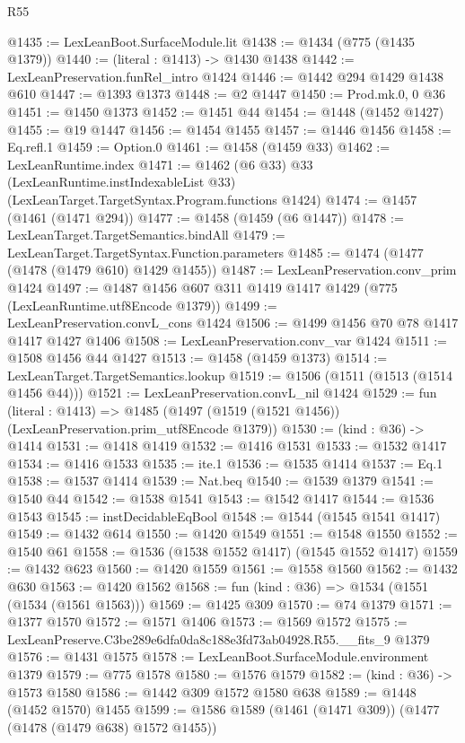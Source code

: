 \begin{lexlean}{R55}
\begin{coremodule}
{{@1435 := LexLeanBoot.SurfaceModule.lit
@1438 := @1434 (@775 (@1435 @1379))
@1440 := (literal : @1413) -> @1430 @1438
@1442 := LexLeanPreservation.funRel_intro @1424
@1446 := @1442 @294 @1429 @1438 @610
@1447 := @1393 @1373
@1448 := @2 @1447
@1450 := Prod.mk.{0, 0} @36
@1451 := @1450 @1373
@1452 := @1451 @44
@1454 := @1448 (@1452 @1427)
@1455 := @19 @1447
@1456 := @1454 @1455
@1457 := @1446 @1456
@1458 := Eq.refl.{1}
@1459 := Option.{0}
@1461 := @1458 (@1459 @33)
@1462 := LexLeanRuntime.index
@1471 := @1462
    (@6 @33)
    @33
    (LexLeanRuntime.instIndexableList @33)
    (LexLeanTarget.TargetSyntax.Program.functions @1424)
@1474 := @1457 (@1461 (@1471 @294))
@1477 := @1458 (@1459 (@6 @1447))
@1478 := LexLeanTarget.TargetSemantics.bindAll
@1479 := LexLeanTarget.TargetSyntax.Function.parameters
@1485 := @1474 (@1477 (@1478 (@1479 @610) @1429 @1455))
@1487 := LexLeanPreservation.conv_prim @1424
@1497 := @1487 @1456 @607 @311 @1419 @1417 @1429 (@775 (LexLeanRuntime.utf8Encode @1379))
@1499 := LexLeanPreservation.convL_cons @1424
@1506 := @1499 @1456 @70 @78 @1417 @1417 @1427 @1406
@1508 := LexLeanPreservation.conv_var @1424
@1511 := @1508 @1456 @44 @1427
@1513 := @1458 (@1459 @1373)
@1514 := LexLeanTarget.TargetSemantics.lookup
@1519 := @1506 (@1511 (@1513 (@1514 @1456 @44)))
@1521 := LexLeanPreservation.convL_nil @1424
@1529 := fun (literal : @1413) =>
  @1485 (@1497 (@1519 (@1521 @1456)) (LexLeanPreservation.prim_utf8Encode @1379))
@1530 := (kind : @36) -> @1414
@1531 := @1418 @1419
@1532 := @1416 @1531
@1533 := @1532 @1417
@1534 := @1416 @1533
@1535 := ite.{1}
@1536 := @1535 @1414
@1537 := Eq.{1}
@1538 := @1537 @1414
@1539 := Nat.beq
@1540 := @1539 @1379
@1541 := @1540 @44
@1542 := @1538 @1541
@1543 := @1542 @1417
@1544 := @1536 @1543
@1545 := instDecidableEqBool
@1548 := @1544 (@1545 @1541 @1417)
@1549 := @1432 @614
@1550 := @1420 @1549
@1551 := @1548 @1550
@1552 := @1540 @61
@1558 := @1536 (@1538 @1552 @1417) (@1545 @1552 @1417)
@1559 := @1432 @623
@1560 := @1420 @1559
@1561 := @1558 @1560
@1562 := @1432 @630
@1563 := @1420 @1562
@1568 := fun (kind : @36) => @1534 (@1551 (@1534 (@1561 @1563)))
@1569 := @1425 @309
@1570 := @74 @1379
@1571 := @1377 @1570
@1572 := @1571 @1406
@1573 := @1569 @1572
@1575 := LexLeanPreserve.C3be289e6dfa0da8c188e3fd73ab04928.R55.__fits_9 @1379
@1576 := @1431 @1575
@1578 := LexLeanBoot.SurfaceModule.environment @1379
@1579 := @775 @1578
@1580 := @1576 @1579
@1582 := (kind : @36) -> @1573 @1580
@1586 := @1442 @309 @1572 @1580 @638
@1589 := @1448 (@1452 @1570) @1455
@1599 := @1586 @1589 (@1461 (@1471 @309)) (@1477 (@1478 (@1479 @638) @1572 @1455))
}}
\end{coremodule}
\end{lexlean}
